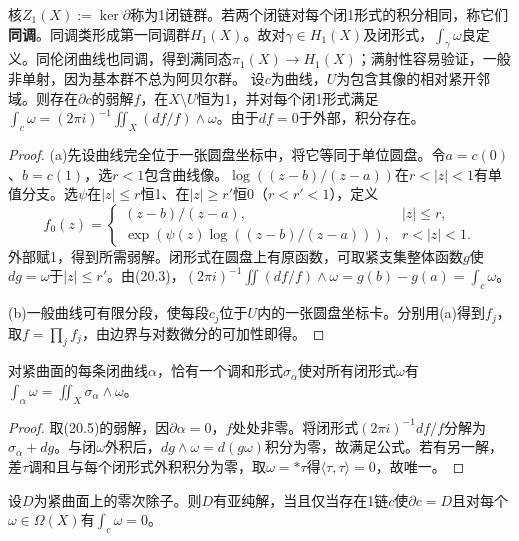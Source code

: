 核$Z_1(X):=\ker\partial$称为1闭链群。若两个闭链对每个闭1形式的积分相同，称它们\textbf{同调}。同调类形成第一同调群$H_1(X)$。故对$\gamma\in H_1(X)$及闭形式，$\int_\gamma\omega$良定义。同伦闭曲线也同调，得到满同态$\pi_1(X)\to H_1(X)$；满射性容易验证，一般非单射，因为基本群不总为阿贝尔群。
设$c$为曲线，$U$为包含其像的相对紧开邻域。则存在$\partial c$的弱解$f$，在$X\setminus U$恒为1，并对每个闭1形式满足$\int_c\omega=(2\pi i)^{-1}\iint_X(df/f)\wedge\omega$。由于$df=0$于外部，积分存在。
\begin{proof}
(a)先设曲线完全位于一张圆盘坐标中，将它等同于单位圆盘。令$a=c(0)$、$b=c(1)$，选$r<1$包含曲线像。$\log((z-b)/(z-a))$在$r<|z|<1$有单值分支。选$\psi$在$|z|\le r$恒1、在$|z|\ge r'$恒0（$r<r'<1$），定义
\[
f_0(z)=\begin{cases}(z-b)/(z-a),&|z|\le r,\\
\exp(\psi(z)\log((z-b)/(z-a))),&r<|z|<1.
\end{cases}
\]
外部赋1，得到所需弱解。闭形式在圆盘上有原函数，可取紧支集整体函数$g$使$dg=\omega$于$|z|\le r'$。由(20.3)，$(2\pi i)^{-1}\iint(df/f)\wedge\omega=g(b)-g(a)=\int_c\omega$。

(b)一般曲线可有限分段，使每段$c_j$位于$U$内的一张圆盘坐标卡。分别用(a)得到$f_j$，取$f=\prod_jf_j$，由边界与对数微分的可加性即得。
\end{proof}
对紧曲面的每条闭曲线$\alpha$，恰有一个调和形式$\sigma_\alpha$使对所有闭形式$\omega$有$\int_\alpha\omega=\iint_X\sigma_\alpha\wedge\omega$。
\begin{proof}
取(20.5)的弱解，因$\partial\alpha=0$，$f$处处非零。将闭形式$(2\pi i)^{-1}df/f$分解为$\sigma_\alpha+dg$。与闭$\omega$外积后，$dg\wedge\omega=d(g\omega)$积分为零，故满足公式。若有另一解，差$\tau$调和且与每个闭形式外积积分为零，取$\omega=*\tau$得$\langle\tau,\tau\rangle=0$，故唯一。
\end{proof}
设$D$为紧曲面上的零次除子。则$D$有亚纯解，当且仅当存在1链$c$使$\partial c=D$且对每个$\omega\in\Omega(X)$有$\int_c\omega=0$。

